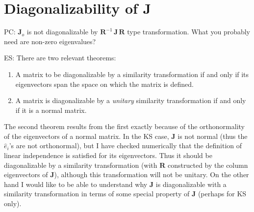 \documentclass[pre,preprint,groupedaddress,showpacs,showkeys]{revtex4}
\begin{document}
\appendix

 \section{Diagonalizability of J}

  \label{appe:DiagJ}

  PC:   $\mathbf{J}_o$ is not diagonalizable by $\mathbf{R}^{-1}\,\mathbf{J}\,\mathbf{R}$
        type transformation. What you probably need are non-zero
        eigenvalues?

  ES:   There are two relevant theorems:
         \begin{enumerate}
                    \item   A matrix to be diagonalizable by a similarity
                            transformation if and only if its eigenvectors span
                            the space on which the matrix is defined.
                    \item   A matrix is diagonalizable by a
                            \emph{unitary} similarity
                            transformation if and only if it is a
                            normal matrix.
         \end{enumerate}
        The second theorem results from the first exactly
        because of the orthonormality of the eigenvectors
        of a normal matrix. In the KS case, $\mathbf{J}$ is
        not normal (thus the $\hat{e}_i$'s are not
        orthonormal),
        but I have checked numerically that the
        definition of linear independence is satisfied for
        its eigenvectors. Thus it should be diagonalizable
        by a similarity transformation (with $\mathbf{R}$
        constructed by the column eigenvectors of
        $\mathbf{J}$), although this transformation will
        not be unitary. On the other hand I would like to
        be able to understand why $\mathbf{J}$ is diagonalizable
        with a similarity transformation in
        terms of some special property of $\mathbf{J}$
        (perhaps for KS only).









 
 
 \nocite{*}
\end{document}
